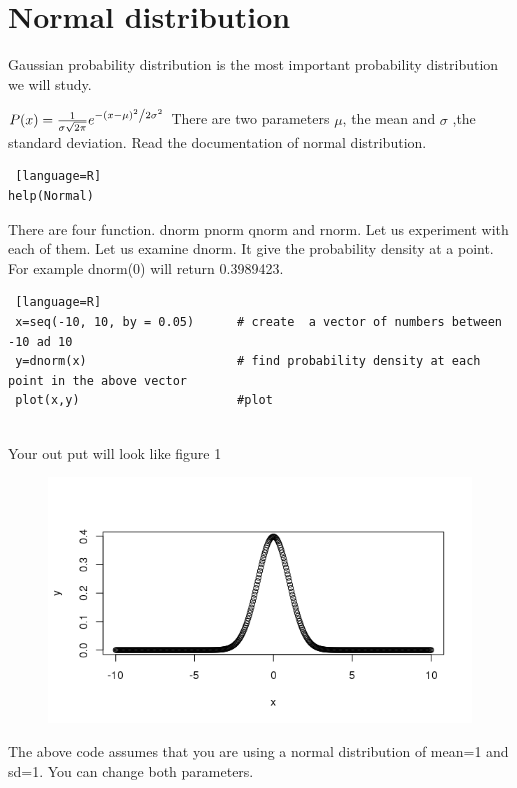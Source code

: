 \documentclass["../Applied_probabillity _and_statistics_lab_KTU.tex"]{subfiles}
\begin{document}
 \section{Normal distribution}
 Gaussian probability distribution is the most important probability distribution we will study.

 
 $P(x) = \frac{1}{{\sigma \sqrt {2\pi } }}e^{{{ - \left( {x - \mu } \right)^2 } \mathord{\left/ {\vphantom {{ - \left( {x - \mu } \right)^2 } {2\sigma ^2 }}} \right. \kern-\nulldelimiterspace} {2\sigma ^2 }}}$
 There are two parameters $\mu$, the mean and $\sigma $ ,the standard deviation.
  Read the documentation of normal distribution.
\begin{lstlisting} [language=R]
help(Normal)
 \end{lstlisting} 
 There are four  function. dnorm pnorm qnorm and rnorm. Let us experiment with each of them. 
 Let us examine dnorm. It give the probability density at a point. For example dnorm(0) will return 0.3989423.
 
 \begin{lstlisting} [language=R]
 x=seq(-10, 10, by = 0.05)      # create  a vector of numbers between -10 ad 10
 y=dnorm(x)                     # find probability density at each point in the above vector
 plot(x,y)                      #plot 
 
 \end{lstlisting}
 
 Your out put will look like figure 1
\begin{figure}
 \includegraphics[scale=.4]{images/normal.png}
 \label{norm}
 \end{figure} 
 
 The above code assumes that you are using a normal distribution of mean=1 and sd=1. You can change both parameters.
 
\end{document}
